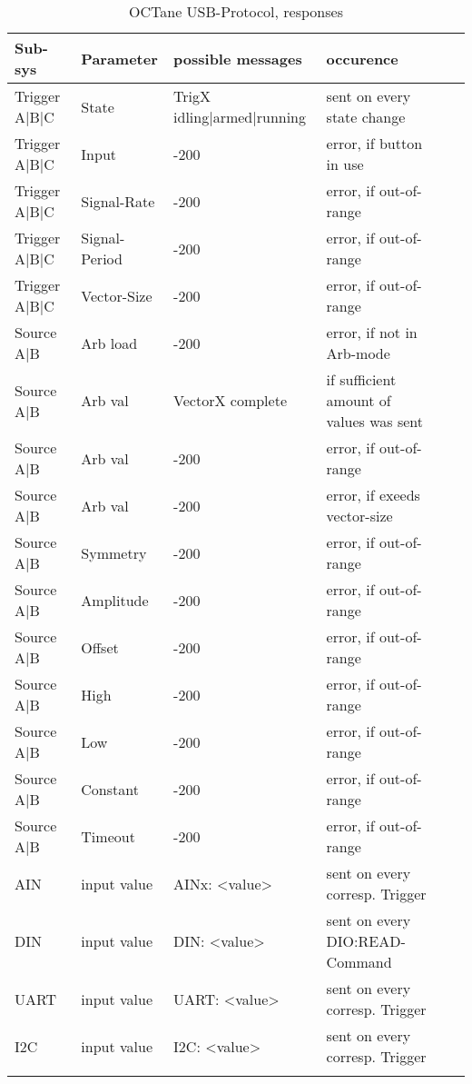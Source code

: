			\centering
			\begin{longtable}{|l|l|l|l|l|l|}
			\hline


		Sub-sys					&  Parameter	 	& possible messages	& occurence 						& 			&  \\ \hline
		\redrow	Trigger A|B|C	&  State	 		& TrigX idling|armed|running& sent on every state change 		& 			& 	\\ \hline
				Trigger A|B|C 	& Input				& -200				& error, if button in use			& 			& 	\\ \hline
				Trigger A|B|C 	& Signal-Rate		& -200				& error, if out-of-range			& 			& 	\\ \hline
				Trigger A|B|C 	& Signal-Period		& -200				& error, if out-of-range			& 			& 	\\ \hline
				Trigger A|B|C 	& Vector-Size		& -200				& error, if out-of-range			& 			& 	\\ \hline
		\redrow	Source A|B		& Arb load	 		& -200				& error, if not in Arb-mode			& 			& 	\\ \hline
				Source A|B		& Arb val	 		& VectorX complete	& if sufficient amount of values was sent	& 			& 	\\ \hline
				Source A|B		& Arb val	 		& -200				& error, if out-of-range			& 			& 	\\ \hline
				Source A|B		& Arb val	 		& -200				& error, if exeeds vector-size		& 			& 	\\ \hline
				Source A|B		& Symmetry	 		& -200				& error, if out-of-range			& 			& 	\\ \hline
				Source A|B		& Amplitude			& -200				& error, if out-of-range			& 			& 	\\ \hline
				Source A|B		& Offset			& -200				& error, if out-of-range			& 			& 	\\ \hline
				Source A|B		& High				& -200				& error, if out-of-range			& 			& 	\\ \hline
				Source A|B		& Low				& -200				& error, if out-of-range			& 			& 	\\ \hline
				Source A|B		& Constant			& -200				& error, if out-of-range			& 			& 	\\ \hline
				Source A|B		& Timeout			& -200				& error, if out-of-range			& 			& 	\\ \hline

		\redrow	AIN 			& input value		& AINx: <value>		& sent on every corresp. Trigger	& 			& 	\\ \hline
				DIN 			& input value		& DIN: <value>		& sent on every DIO:READ-Command	& 			& 	\\ \hline
				UART 			& input value		& UART: <value>		& sent on every corresp. Trigger	& 			& 	\\ \hline
				I2C 			& input value		& I2C: <value>		& sent on every corresp. Trigger	& 			& 	\\ \hline
		\caption{OCTane USB-Protocol, responses}
		\label{USB-Protocol-responses}
		\end{longtable}
